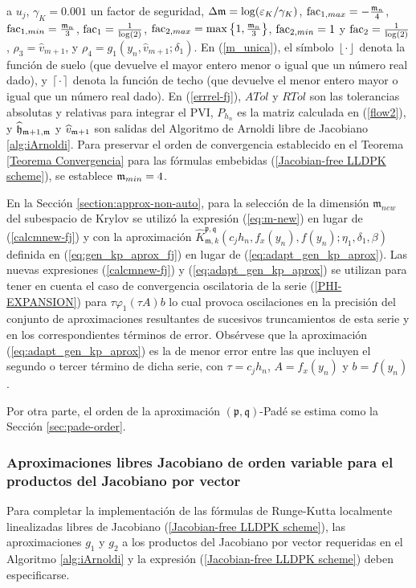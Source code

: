 a $u_j$, $\gamma_{K}=0.001$ un factor de seguridad,
$\Delta\mathfrak{m}=\log(\varepsilon_{K}/\gamma_{K})$,
$\mathrm{fac}_{1,max}= -\frac{\mathfrak{m}_n}{4}$, $\mathrm{fac}_{1,min}= \frac{\mathfrak{m}_n}{3}$, $\mathrm{fac}_1=\frac{1} {\log(2)}$, $\mathrm{fac}_{2,max}= \max\left\{  1,\frac{\mathfrak{m}_{n}}{3}  \right\}$, $\mathrm{fac}_{2,min}= 1 $ y $\mathrm{fac}_2=\frac{1}{\log(2)}$, $\rho_3 =\hat{v}_{m+1}$, y $\rho_4 = g_1(y_n,\hat{v}_ {m+1};\delta_1)$. En (\ref{m_unica}), el símbolo $\left\lfloor \cdot \right\rfloor$ denota la función de suelo (que devuelve el mayor entero menor o igual que un número real dado), y $\left\lceil \cdot \right\rceil$ denota la función de techo (que devuelve el menor entero mayor o igual que un número real dado). En (\ref{errrel-fj}), $ATol$ y $RTol$ son las tolerancias absolutas y relativas para integrar el PVI, $P_{h_n}$ es la matriz calculada en (\ref{flow2}), y $\widehat {\mathfrak{h}}_{\mathfrak{m}+1,\mathfrak{m}}$ y $\widehat{v}_{\mathfrak{m}+1}$ son salidas del Algoritmo de Arnoldi libre de Jacobiano \ref{alg:iArnoldi}. Para preservar el orden de convergencia establecido en el Teorema \ref{Teorema Convergencia} para las fórmulas embebidas (\ref{Jacobian-free LLDPK scheme}), se establece $\mathfrak{m}_{min}=4$.

En la Sección \ref{section:approx-non-auto}, para la selección de la dimensión $\mathfrak{m}_{new}$ del subespacio de Krylov se utilizó la expresión (\ref{eq:m-new}) en lugar de (\ref{calcmnew-fj}) y con la aproximación
$\widehat{K}_{\mathfrak{m},k}^{\mathfrak{p},\mathfrak{q}}\left(
c_{j}h_{n},f_{x}(y_{n}),f(y_{n});\eta _{1},\delta _{1},\beta \right)
$ definida en (\ref{eq:gen_kp_aprox_fj}) en lugar de (\ref{eq:adapt_gen_kp_aprox}). Las nuevas expresiones (\ref{calcmnew-fj}) y (\ref{eq:adapt_gen_kp_aprox}) se utilizan para tener en cuenta el caso de convergencia oscilatoria de la serie (\ref{PHI-EXPANSION}) para $\tau\varphi_1(\tau A) b$ lo cual provoca oscilaciones en la precisión del conjunto de aproximaciones resultantes de sucesivos truncamientos de esta serie y en los correspondientes términos de error. Obsérvese que la aproximación (\ref{eq:adapt_gen_kp_aprox}) es la de menor error entre las que incluyen el segundo o tercer término de dicha serie, con $\tau = c_jh_n$, $A=f_x(y_n)$ y $b=f(y_n)$.

Por otra parte, el orden de la aproximación $(\mathfrak{p},\mathfrak{q})$-Padé se estima como la Sección \ref{sec:pade-order}.

\subsubsection{Aproximaciones libres Jacobiano de orden variable para el productos del Jacobiano por vector}
Para completar la implementación de las fórmulas de Runge-Kutta localmente linealizadas libres de Jacobiano (\ref{Jacobian-free LLDPK scheme}), las aproximaciones $g_1$ y $g_2$ a los productos del Jacobiano por vector requeridas en el Algoritmo \ref{alg:iArnoldi} y la expresión (\ref{Jacobian-free LLDPK scheme}) deben especificarse.

